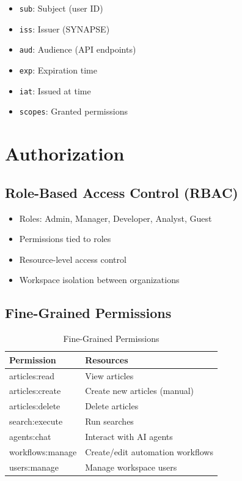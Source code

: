 \documentclass[12pt,a4paper]{report}
\begin{document}
\begin{itemize}[label=\textbullet]
    \item \texttt{sub}: Subject (user ID)
    \item \texttt{iss}: Issuer (SYNAPSE)
    \item \texttt{aud}: Audience (API endpoints)
    \item \texttt{exp}: Expiration time
    \item \texttt{iat}: Issued at time
    \item \texttt{scopes}: Granted permissions
\end{itemize}

\section{Authorization}

\subsection{Role-Based Access Control (RBAC)}

\begin{itemize}[label=\textbullet]
    \item Roles: Admin, Manager, Developer, Analyst, Guest
    \item Permissions tied to roles
    \item Resource-level access control
    \item Workspace isolation between organizations
\end{itemize}

\subsection{Fine-Grained Permissions}

\begin{table}[H]
\centering
\small
\begin{tabular}{|l|l|}
\hline
\textbf{Permission} & \textbf{Resources} \\
\hline
articles:read & View articles \\
articles:create & Create new articles (manual) \\
articles:delete & Delete articles \\
search:execute & Run searches \\
agents:chat & Interact with AI agents \\
workflows:manage & Create/edit automation workflows \\
users:manage & Manage workspace users \\
\hline
\end{tabular}
\caption{Fine-Grained Permissions}
\end{table}
\end{document}
